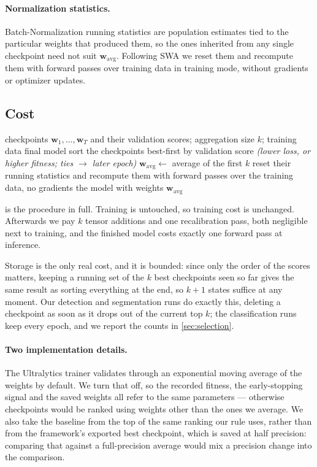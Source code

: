 \paragraph{Normalization statistics.}
Batch-Normalization \cite{ioffe2015batch} running statistics are population
estimates tied to the particular weights that produced them, so the ones
inherited from any single checkpoint need not suit
$\mathbf{w}_{\text{avg}}$. Following SWA
\cite{izmailov2019averagingweightsleadswider} we reset them and recompute them
with forward passes over training data in training mode, without gradients or
optimizer updates.

\subsection{Cost}

\begin{algorithm}[t]
\caption{Top-$k$ checkpoint averaging}
\label{alg:topk}
\begin{algorithmic}[1]
\Require checkpoints $\mathbf{w}_1,\dots,\mathbf{w}_T$ and their validation
scores; aggregation size $k$; training data
\Ensure final model
\State sort the checkpoints best-first by validation score
\Statex \hfill\textit{(lower loss, or higher fitness; ties $\to$ later epoch)}
\State $\mathbf{w}_{\text{avg}} \gets$ average of the first $k$
  \State reset their running statistics and recompute them
  with forward passes over the training data, no gradients
\EndIf
\State \Return the model with weights $\mathbf{w}_{\text{avg}}$
\end{algorithmic}
\end{algorithm}

 is the procedure in full. Training is untouched, so training
cost is unchanged. Afterwards we pay $k$ tensor additions and one
recalibration pass, both negligible next to training, and the finished model
costs exactly one forward pass at inference.

Storage is the only real cost, and it is bounded: since only the order of the
scores matters, keeping a running set of the $k$ best checkpoints seen so far
gives the same result as sorting everything at the end, so $k{+}1$ states
suffice at any moment. Our detection and segmentation runs do exactly this,
deleting a checkpoint as soon as it drops out of the current top $k$; the
classification runs keep every epoch, and we report the counts in
\cref{sec:selection}.

\paragraph{Two implementation details.}
The Ultralytics trainer validates through an exponential moving average of the
weights by default. We turn that off, so the recorded fitness, the
early-stopping signal and the saved weights all refer to the same parameters ---
otherwise checkpoints would be ranked using weights other than the ones we
average. We also take the baseline from the top of the same ranking our rule
uses, rather than from the framework's exported best checkpoint, which is saved
at half precision: comparing that against a full-precision average would mix a
precision change into the comparison.
